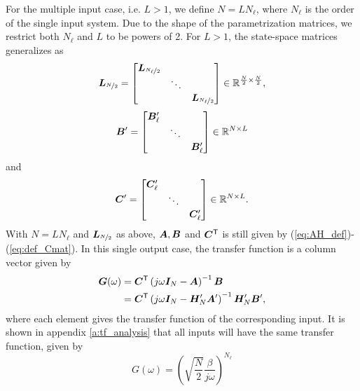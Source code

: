 For the multiple input case, i.e. $L>1$, we define $N = L N_\ell$, where $N_\ell$ is the order of the single input system. Due to the shape of the parametrization matrices, we restrict both $N_\ell$ and $L$ to be powers of 2. For $L>1$, the state-space matrices generalizes as
\begin{equation}
    \bm{L}_{\nicefrac{N}{2}} =
    \begin{bmatrix}
        \bm{L}_{\nicefrac{N_\ell}{2}} \\
        &  \ddots & \\
        & & \bm{L}_{\nicefrac{N_\ell}{2}}
    \end{bmatrix}
    \in \mathbb{R}^{\frac{N}{2} \times \frac{N}{2}},
\end{equation}
\begin{equation}
    \bm{B}' =
    \begin{bmatrix}
        \bm{B}'_\ell \\
        &  \ddots & \\
        & & \bm{B}'_\ell
    \end{bmatrix}
    \in \mathbb{R}^{N \times L}
\end{equation}
and
\begin{equation}
    \bm{C}' =
    \begin{bmatrix}
        \bm{C}'_\ell \\
        &  \ddots & \\
        & & \bm{C}'_\ell
    \end{bmatrix}
    \in \mathbb{R}^{N \times L}.
\end{equation}
With $N=LN_\ell$ and $\bm{L}_{\nicefrac{N}{2}}$ as above, $\bm{A}, \bm{B}$ and $\bm{C}^\mathsf{T}$ is still given by (\ref{eq:AH_def})-(\ref{eq:def_Cmat}).
In this single output case, the transfer function is a column vector given by
\begin{align}
    \bm{G}(\omega) & = \bm{C}^\mathsf{T} \left( j\omega \bm{I}_{N} - \bm{A} \right)^{-1} \bm{B} \\
                   & = \bm{C}^\mathsf{T} \left( j\omega \bm{I}_{N} - \bm{H_}{N}' \bm{A}' \right)^{-1} \bm{H_}{N}' \bm{B}',
\end{align}
where each element gives the transfer function of the corresponding input. It is shown in appendix \ref{a:tf_analysis} that all inputs will have the same transfer function, given by
\begin{equation}
    G(\omega) = \left( \sqrt{\frac{N}{2}}\frac{\beta}{j\omega} \right)^{N_\ell}
\end{equation}


